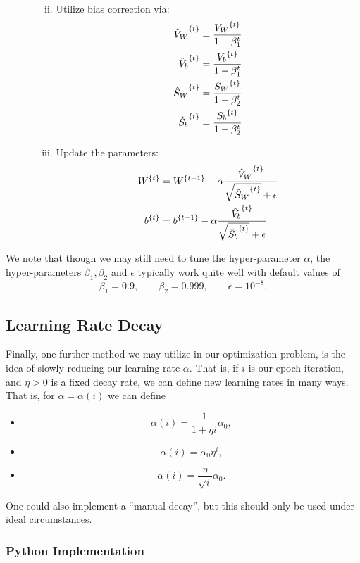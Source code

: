 \begin{enumerate}
\begin{enumerate}[a.]
\begin{enumerate}[i.]
\begin{align*}
			\end{align*}
			\item Utilize bias correction via:
			\begin{align*}
				{\hat{V}_W}^{\{{t}\}}&=\frac{{V_W}^{\{{t}\}}}{1-\beta_1^t}\\
				{\hat{V}_b}^{\{{t}\}}&=\frac{{V_b}^{\{{t}\}}}{1-\beta_1^t}\\
				{\hat{S}_W}^{\{{t}\}}&=\frac{{S_W}^{\{{t}\}}}{1-\beta_2^t}\\
				{\hat{S}_b}^{\{{t}\}}&=\frac{{S_b}^{\{{t}\}}}{1-\beta_2^t}
			\end{align*}
			\item Update the parameters:
			\begin{align*}
				{W}^{\{{t}\}}&={W}^{\{{t-1}\}}-\alpha\frac{{\hat{V}_W}^{\{{t}\}}}{\sqrt{{\hat{S}_W}^{\{{t}\}}}+\epsilon}\\
				{b}^{\{{t}\}}&={b}^{\{{t-1}\}}-\alpha\frac{{\hat{V}_b}^{\{{t}\}}}{\sqrt{{\hat{S}_b}^{\{{t}\}}}+\epsilon}
			\end{align*}
		\end{enumerate}
	\end{enumerate}
\end{enumerate}

We note that though we may still need to tune the hyper-parameter $\alpha$, the hyper-parameters $\beta_1,\beta_2$ and $\epsilon$ typically work quite well with default values of
$$\beta_1=0.9,\qquad\beta_2=0.999,\qquad\epsilon=10^{-8}.$$



\subsection{Learning Rate Decay}

Finally, one further method we may utilize in our optimization problem, is the idea of slowly reducing our learning rate $\alpha$.  That is, if $i$ is our epoch iteration, and $\eta>0$ is a fixed decay rate, we can define new learning rates in many ways.  That is, for $\alpha=\alpha(i)$ we can define
\begin{itemize}
	\item $$\alpha(i)=\frac{1}{1+\eta i}\alpha_0,$$
	\item $$\alpha(i)=\alpha_0\eta^i,$$
	\item $$\alpha(i)=\frac{\eta}{\sqrt{i}}\alpha_0.$$
\end{itemize}
One could also implement a ``manual decay'', but this should only be used under ideal circumstances.



\subsubsection{Python Implementation}
%






